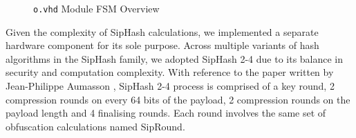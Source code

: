 \documentclass[a4paper]{report}
\newcommand{\code}{\texttt}
\begin{document}
\begin{figure}[h!]
\begin{minipage}{.45\textwidth}
  \caption{\code{o.vhd} Module FSM Overview}
  \label{fig:coreout-fsm}
\end{minipage}
\end{figure}

Given the complexity of SipHash calculations, we implemented a separate hardware component for its sole purpose. Across multiple variants of hash algorithms in the SipHash family, we adopted SipHash 2-4 due to its balance in security and computation complexity. With reference to the paper written by Jean-Philippe Aumasson \cite{aumasson-bernstein-2012}, SipHash 2-4 process is comprised of a key round, 2 compression rounds on every 64 bits of the payload, 2 compression rounds on the payload length and 4 finalising rounds. Each round involves the same set of obfuscation calculations named SipRound.
\end{document}

